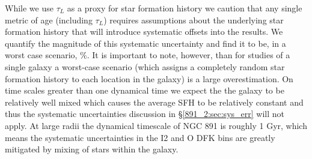 


While we use $\tau_L$ as a proxy for star formation history we caution
that any single metric of age (including $\tau_L$) requires
assumptions about the underlying star formation history that will
introduce systematic offsets into the results. We quantify the
magnitude of this systematic uncertainty and find it to be, in a worst
case scenario, \%. It is important to note, however, than for
studies of a single galaxy a worst-case scenario (which assigns a
completely random star formation history to each location in the
galaxy) is a large overestimation. On time scales greater than one
dynamical time we expect the the galaxy to be relatively well mixed
which causes the average SFH to be relatively constant and thus the
systematic uncertainties discussion in \S\ref{891_2:sec:sys_err} will
not apply. At large radii the dynamical timescale of NGC 891 is
roughly 1 Gyr, which means the systematic uncertainties in the I2 and
O DFK bins are greatly mitigated by mixing of stars within the galaxy.

